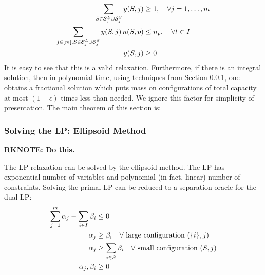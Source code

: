 \begin{align}
\label{eq:config1}
\sum_{S \in {\cal S}^L_j \cup {\cal S}^S_j} y(S,j) & \geq 1, \ \ \ \forall j=1, \ldots, m \\
\label{eq:config2}
\sum_{j \in [m], S \in {\cal S}^L_j \cup {\cal S}^S_j} y(S,j) \, n(S,p) & \leq n_p, \ \ \ \forall t  \in I \\
\notag
y({S,j}) & \geq 0
\end{align}
\fi
It is easy to see that this is a valid relaxation. Furthermore, if there is an integral solution, then in polynomial time, using techniques from Section \ref{}, one obtains a fractional solution which 
puts mass on configurations of total capacity at most $(1-\epsilon)$ times less than needed. We ignore this factor for simplicity of presentation. 
The main theorem of this section is:
%

\iffalse
\subsubsection{Solving the LP: Ellipsoid Method}
{\bf RKNOTE: Do this.}

The LP relaxation can be solved by the ellipsoid method. The LP has exponential number of variables and polynomial (in fact, linear) number of
constraints. Solving the primal LP  can be reduced to
a separation oracle for the dual LP:
\begin{align}
\label{eq:config3}
 \sum_{j=1}^m \alpha_j - \sum_{i \in I} \beta_i & \leq 0 \\
\label{eq:config4}
\alpha_j & \geq  \beta_i \ \ \ \forall \ {\mbox{large configuration $(\{i\}, j)$}} \\
\label{eq:config5}
\alpha_j & \geq  \sum_{i \in S} \beta_i \ \ \ \forall \ {\mbox{small configuration $(S, j)$}} \\
\notag
\alpha_j, \beta_i & \geq 0
\end{align}


